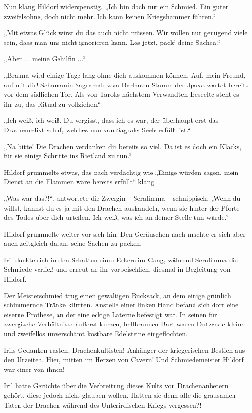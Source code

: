 Nun klang Hildorf widerspenstig. „Ich bin doch nur ein Schmied. Ein guter zweifelsohne, doch nicht mehr. Ich kann keinen Kriegshammer führen.“

„Mit etwas Glück wirst du das auch nicht müssen. Wir wollen nur genügend viele sein, dass man uns nicht ignorieren kann. Los jetzt, pack‘ deine Sachen.“

„Aber ... meine Gehilfin ...“

„Branna wird einige Tage lang ohne dich auskommen können. Auf, mein Freund, auf mit dir! Schamanin Sagramak vom Barbaren-Stamm der Jpaxo wartet bereits vor dem südlichen Tor. Als von Taroks nächstem Verwandten Beseelte steht es ihr zu, das Ritual zu vollziehen.“

„Ich weiß, ich weiß. Du vergisst, dass ich es war, der überhaupt erst das Drachenrelikt schuf, welches nun von Sagraks Seele erfüllt ist.“

„Na bitte! Die Drachen verdanken dir bereits so viel. Da ist es doch ein Klacks, für sie einige Schritte ins Rietland zu tun.“

Hildorf grummelte etwas, das nach verdächtig wie „Einige würden sagen, mein Dienst an die Flammen wäre bereits erfüllt“ klang.

„Was war das?!“, antwortete die Zwergin – Serafimma – schnippisch, „Wenn du willst, kannst du es ja mit den Drachen aushandeln, wenn sie hinter der Pforte des Todes über dich urteilen. Ich weiß, was ich an deiner Stelle tun würde.“

Hildorf grummelte weiter vor sich hin. Den Geräuschen nach machte er sich aber auch zeitgleich daran, seine Sachen zu packen.

Iril duckte sich in den Schatten eines Erkers im Gang, während Serafimma die Schmiede verließ und erneut an ihr vorbeischlich, diesmal in Begleitung von Hildorf.

Der Meisterschmied trug einen gewaltigen Rucksack, an dem einige grünlich schimmernde Tränke klirrten. Anstelle einer linken Hand befand sich dort eine eiserne Prothese, an der eine eckige Laterne befestigt war. In seinen für zwergische Verhältnisse äußerst kurzen, hellbraunen Bart waren Dutzende kleine und zweifellos unverschämt kostbare Edelsteine eingeflochten.

Irils Gedanken rasten. Drachenkultisten! Anhänger der kriegerischen Bestien aus den Urzeiten. Hier, mitten im Herzen von Cavern! Und Schmiedemeister Hildorf war einer von ihnen!

Iril hatte Gerüchte über die Verbreitung dieses Kults von Drachenanbetern gehört, diese jedoch nicht glauben wollen. Hatten sie denn alle die grausamen Taten der Drachen während des Unterirdischen Kriegs vergessen?!

